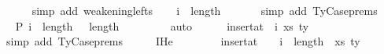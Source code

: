 \begin{isabellebody}
\ \ \ \ \isamarkupfalse%
\ {\isacharparenleft}{\kern0pt}simp\ add{\isacharcolon}{\kern0pt}\ weakening{\isacharunderscore}{\kern0pt}lefts{}{\isacharparenright}{\kern0pt}\isanewline
\isanewline
\ \ \isamarkupfalse%
\ {\isachardoublequoteopen}i\ {\isasymle}\ length\ {\isasymGamma}{}{\isachardoublequoteclose}\isanewline
\ \ \ \ \isamarkupfalse%
\ {\isacharparenleft}{\kern0pt}simp\ add{\isacharcolon}{\kern0pt}\ TyCase{\isachardot}{\kern0pt}prems{\isacharparenleft}{\kern0pt}{}{\isacharparenright}{\kern0pt}{\isacharparenright}{\kern0pt}\isanewline
\ \ \isamarkupfalse%
\ \isamarkupfalse%
\ P{}{\isacharcolon}{\kern0pt}\ {\isachardoublequoteopen}i\ {\isacharplus}{\kern0pt}\ length\ {\isasymGamma}{}{\isacharprime}{\kern0pt}\ {\isasymle}\ length\ {\isacharparenleft}{\kern0pt}{\isasymGamma}{}{\isacharprime}{\kern0pt}\ {\isacharat}{\kern0pt}\ {\isasymGamma}{}{\isacharparenright}{\kern0pt}{\isachardoublequoteclose}\isanewline
\ \ \ \ \isamarkupfalse%
\ auto\isanewline
\isanewline
\isanewline
\ \ \isamarkupfalse%
\ {\isachardoublequoteopen}{\isasymGamma}\ {\isacharequal}{\kern0pt}\ insert{\isacharunderscore}{\kern0pt}at\ {\isasymGamma}{}\ i\ {\isacharparenleft}{\kern0pt}xs{\isacharcomma}{\kern0pt}\ ty{}{\isacharparenright}{\kern0pt}{\isachardoublequoteclose}\isanewline
\ \ \ \ \isamarkupfalse%
\ {\isacharparenleft}{\kern0pt}simp\ add{\isacharcolon}{\kern0pt}\ TyCase{\isachardot}{\kern0pt}prems{\isacharparenleft}{\kern0pt}{}{\isacharparenright}{\kern0pt}{\isacharparenright}{\kern0pt}\isanewline
\ \ \isamarkupfalse%
\ \isamarkupfalse%
\ IHe{}{\isacharcolon}{\kern0pt}\isanewline
\ \ \ \ {\isachardoublequoteopen}{\isasymGamma}{}{\isacharprime}{\kern0pt}\ {\isacharat}{\kern0pt}\ {\isasymGamma}\ {\isacharequal}{\kern0pt}\ insert{\isacharunderscore}{\kern0pt}at\ {\isacharparenleft}{\kern0pt}{\isasymGamma}{}{\isacharprime}{\kern0pt}\ {\isacharat}{\kern0pt}\ {\isasymGamma}{}{\isacharparenright}{\kern0pt}\ {\isacharparenleft}{\kern0pt}i\ {\isacharplus}{\kern0pt}\ length\ {\isasymGamma}{}{\isacharprime}{\kern0pt}{\isacharparenright}{\kern0pt}\ {\isacharparenleft}{\kern0pt}xs{\isacharcomma}{\kern0pt}\ ty{}{\isacharparenright}{\kern0pt}{\isachardoublequoteclose}\isanewline
\ \ \ \ \isamarkupfalse%

\end{isabellebody}
